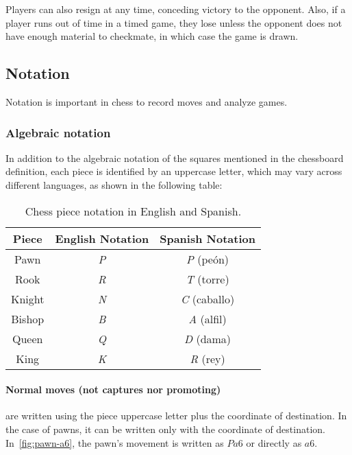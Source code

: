 \noindent Players can also resign at any time, conceding victory to the opponent. Also, if a player runs out of time in a timed game, they lose unless the opponent does not have enough material to checkmate, in which case the game is drawn.

\subsection*{Notation}

Notation is important in chess to record moves and analyze games.

\subsubsection*{Algebraic notation}

In addition to the algebraic notation of the squares mentioned in the chessboard definition, each piece is identified by an uppercase letter, which may vary across different languages, as shown in the following table:

\begin{table}[H]
    \centering
    \begin{tabular}{|c|c|c|}
        \hline
        Piece & English Notation & Spanish Notation \\ \hline
        Pawn           & \textit{P}               & \textit{P} (peón)         \\ \hline
        Rook           & \textit{R}               & \textit{T} (torre)        \\ \hline
        Knight         & \textit{N}               & \textit{C} (caballo)      \\ \hline
        Bishop         & \textit{B}               & \textit{A} (alfil)        \\ \hline
        Queen          & \textit{Q}               & \textit{D} (dama)         \\ \hline
        King           & \textit{K}               & \textit{R} (rey)          \\ \hline
    \end{tabular}
    \caption*{Chess piece notation in English and Spanish.}
\end{table}

\paragraph{Normal moves (not captures nor promoting)}
are written using the piece uppercase letter plus the coordinate of destination. In the case of pawns, it can be written only with the coordinate of destination. In~\cref{fig:pawn-a6}, the pawn's movement is written as $Pa6$ or directly as $a6$.

